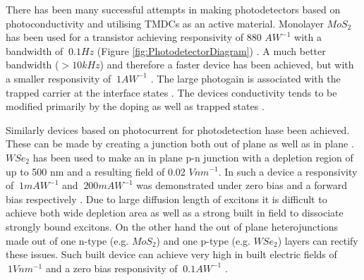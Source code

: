 There has been many successful attempts in making photodetectors based on photoconductivity and utilising TMDCs as an active material. Monolayer $MoS_2$ has been used for a transistor achieving responsivity of 880 $AW^{-1}$ with a bandwidth of $~0.1 Hz$ (Figure \ref{fig:PhotodetectorDiagram}) \cite{Lopez-Sanchez2013}. A much better bandwidth ($>10 kHz$) and therefore a faster device has been achieved, but with a smaller responsivity of $~1 AW^{-1}$ \cite{Tsai2013}. The large photogain is associated with the trapped carrier at the interface states \cite{Katz2001}. The devices conductivity tends to be modified primarily by the doping as well as trapped states \cite{Tsai2013} \cite{Furchi2014}.

Similarly devices based on photocurrent for photodetection hase been achieved. These can be made by creating a junction both out of plane \cite{Withers2015}\cite{Cheng2014} as well as in plane \cite{Ross2014}\cite{Fontana2013}. $WSe_2$ has been used to make an in plane p-n junction with a depletion region of up to 500 nm and a resulting field of 0.02 $V nm^{-1}$.  In such a device a responsivity of $~1 mAW^{-1}$ and $~200 mAW^{-1}$ was demonstrated under zero bias and a forward bias respectively \cite{Baugher2014}. Due to large diffusion length of excitons it is difficult to achieve both wide depletion area as well as a strong built in field to dissociate strongly bound excitons. On the other hand the out of plane heterojunctions made out of one n-type (e.g. $MoS_2$) and one p-type (e.g. $WSe_2$) layers can rectify these issues. Such built device can achieve very high in built electric fields of $~1 V nm^{-1}$ and a zero bias responsivity of $~0.1 A W^{-1}$ \cite{Cheng2014}\cite{Lee2014}. 


